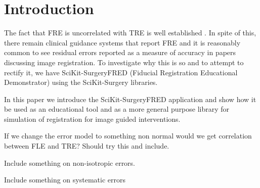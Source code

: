 \section{Introduction}
The fact that \gls{FRE} is uncorrelated with \gls{TRE} is well established 
\cite{fitzpatrick2009}. In spite of this, there remain clinical guidance 
systems that report \gls{FRE} and it is reasonably common to see residual
errors reported as a measure of accuracy in papers discussing image
 registration. To investigate why this is so and to attempt to rectify
 it, we have SciKit-SurgeryFRED (Fiducial Registration Educational Demonstrator)
 \cite{stephen_thompson_2020_3946090} using the 
SciKit-Surgery \cite{PMID:32436132} libraries.

In this paper we introduce the SciKit-SurgeryFRED application and show how it
be used as an educational tool and as a more general purpose library for
simulation of registration for image guided interventions.

If we change the error model to something non normal would we get correlation between FLE and TRE? Should try this and include.

Include something on non-isotropic errors.

Include something on systematic errors

